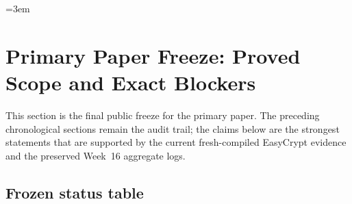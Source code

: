 \fussy
\emergencystretch=3em
\section{Primary Paper Freeze: Proved Scope and Exact Blockers}

This section is the final public freeze for the primary paper.  The preceding
chronological sections remain the audit trail; the claims below are the
strongest statements that are supported by the current fresh-compiled
EasyCrypt evidence and the preserved Week~16 aggregate logs.

\subsection*{Frozen status table}

